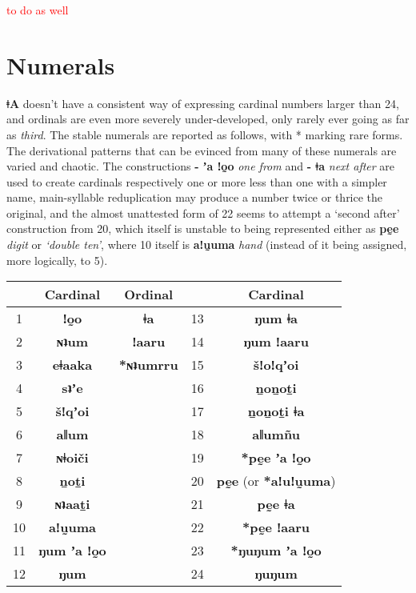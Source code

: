 \documentclass[11pt,a5paper]{book}
\newcommand{\qcn}[1]{\textcolor{AccentText}{\large\textbf{#1}}}
\newcommand{\langname}{\qcn{ǂA}}
\newcommand{\transl}[2]{\qcn{#1} \emph{#2}}
\newcommand{\cmnt}[1]{\textcolor{red}{#1}}
\begin{document}
\cmnt{to do as well}

\section{Numerals}

\langname{} doesn't have a consistent way of expressing cardinal numbers larger than 24, and ordinals are even more severely under-developed, only rarely ever going as far as \emph{third}. The stable numerals are reported as follows, with * marking rare forms. The derivational patterns that can be evinced from many of these numerals are varied and chaotic. The constructions \transl{- ʼa ǃo̰o}{one from} and \transl{- ǂa}{next after} are used to create cardinals respectively one or more less than one with a simpler name, main-syllable reduplication may produce a number twice or thrice the original, and the almost unattested form of 22 seems to attempt a `second after' construction from 20, which itself is unstable to being represented either as \transl{pḛe}{digit} or \emph{`double ten'}, where 10 itself is \transl{aǃṵuma}{hand} (instead of it being assigned, more logically, to 5).

\begin{center}

\begin{tabular}{ccccc}
\hline
& Cardinal & Ordinal & & Cardinal\\ \hline \hline
1 & \qcn{ǃo̰o} & \qcn{ǂa} & 13 & \qcn{ŋum ǂa} \\ \hline
2 & \qcn{ɴʇum} & \qcn{ǃaaru} & 14  &  \qcn{ŋum ǃaaru} \\ \hline
3 & \qcn{eǂaaka} & \qcn{*ɴʇumrru} & 15 & \qcn{šǃoǃqʼoi} \\ \hline
4 & \qcn{sʇʼe} & & 16 & \qcn{ṉoṉoṯi} \\ \hline
5 & \qcn{šǃqʼoi} & & 17 & \qcn{ṉoṉoṯi ǂa} \\ \hline
6 & \qcn{aǁum} & & 18 & \qcn{aǁumñu}  \\ \hline
7 & \qcn{ɴǂoiči} & & 19 & \qcn{*pḛe ʼa ǃo̰o}\\ \hline
8 & \qcn{ṉoṯi} && 20 & \qcn{pḛe} (or \qcn{*aǃuǃṵuma})\\ \hline
9 & \qcn{ɴʇaaṯi} & & 21 & \qcn{pḛe ǂa} \\ \hline
10 & \qcn{aǃṵuma} & & 22 & \qcn{*pḛe ǃaaru} \\ \hline
11 & \qcn{ŋum ʼa ǃo̰o} & & 23 & \qcn{*ŋuŋum ʼa ǃo̰o} \\ \hline
12 & \qcn{ŋum}  & & 24 & \qcn{ŋuŋum} \\ \hline 
\end{tabular}

\end{center}
\end{document}
